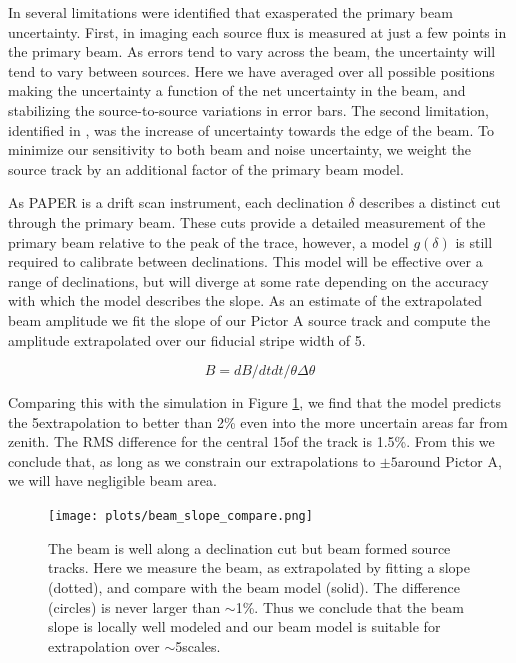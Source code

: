 \documentclass[preprint]{aastex}
\begin{document}
 In \citet{Jacobs:2013p9837} several limitations were identified that
exasperated the primary beam uncertainty.  First, in imaging each source flux is measured at just a few 
points in the primary beam. As errors tend to vary across the beam, the uncertainty will tend to vary between sources.
Here we have averaged over all possible positions making the uncertainty a function of the net uncertainty in the beam,
and stabilizing the source-to-source variations in error bars. The second limitation, identified in \citet{Williams:2012p8768},
was the increase of uncertainty towards the edge of the beam. To minimize our sensitivity to both beam and noise
uncertainty, we weight the source track by an additional factor of the primary beam model.  


As PAPER is a drift scan instrument, each declination $\delta$ describes a distinct cut through the primary beam. These cuts
provide a detailed measurement of the primary beam relative to the peak of the trace, however,
a model $g(\delta)$ is still required to calibrate between declinations. This model will be effective over a range of declinations, but will diverge at
some rate depending on the accuracy with which the model describes the slope.  As an estimate of the extrapolated 
beam amplitude we fit the slope of our Pictor A source track and compute the amplitude extrapolated over our fiducial
stripe width of 5\arcdeg.

\[
B = dB/dt dt/\theta \Delta \theta
\]

Comparing this with the simulation in Figure \ref{fig:beam_extrapolation}, we find that the model predicts the 5\arcdeg extrapolation to better
than 2\% even into the more uncertain areas far from zenith. The RMS difference for the central 15\arcdeg of the track
is 1.5\%. From this we conclude that, as long as we constrain our extrapolations to $\pm5$\arcdeg around Pictor A,
we will have negligible beam area. 

\begin{figure}
\texttt{[image: plots/beam\_slope\_compare.png]}
\caption{The beam is well along a declination cut but beam formed source tracks. Here we measure the beam, 
as extrapolated by fitting a slope (dotted), and compare with the beam model (solid). The difference (circles) is never larger
than $\sim$1\%.  Thus we conclude that the beam slope is locally well modeled and our beam model is suitable 
for extrapolation over $\sim$5\arcdeg scales.
  \label{fig:beam_extrapolation}}
\end{figure}
\end{document}
